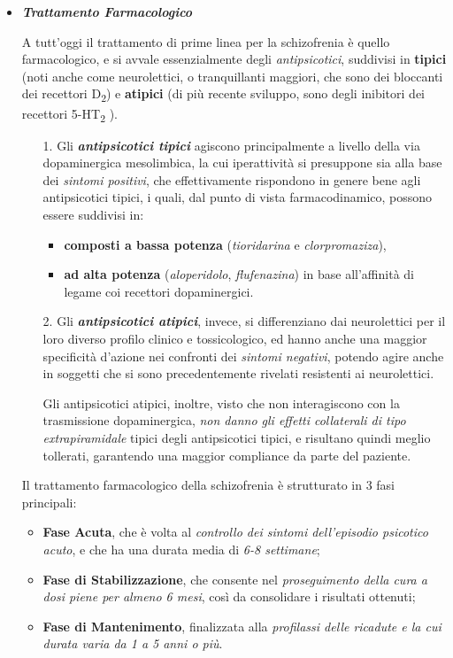 \begin{itemize}
\item
  \textbf{\emph{Trattamento Farmacologico}}

A tutt'oggi il trattamento di prime linea per la schizofrenia è quello
farmacologico, e si avvale essenzialmente degli \emph{antipsicotici},
suddivisi in \textbf{tipici} (noti anche come neurolettici, o
tranquillanti maggiori, che sono dei bloccanti dei recettori
D\textsubscript{2}) e \textbf{atipici} (di più recente sviluppo, sono
degli inibitori dei recettori 5-HT\textsubscript{2} ).

\begin{itemize}
\item[1.]
  Gli \textbf{\emph{antipsicotici tipici}} agiscono principalmente a
  livello della via dopaminergica mesolimbica, la cui iperattività si
  presuppone sia alla base dei \emph{sintomi positivi}, che
  effettivamente rispondono in genere bene agli antipsicotici tipici, i
  quali, dal punto di vista farmacodinamico, possono essere suddivisi
  in:

\begin{itemize}
\item
  \textbf{composti a bassa potenza} (\emph{tioridarina} e
  \emph{clorpromaziza}),
\item
  \textbf{ad alta potenza} (\emph{aloperidolo}, \emph{flufenazina}) in
  base all'affinità di legame coi recettori dopaminergici.
\end{itemize}

\item[2.]
  Gli \textbf{\emph{antipsicotici atipici}}, invece, si differenziano
  dai neurolettici per il loro diverso profilo clinico e tossicologico,
  ed hanno anche una maggior specificità d'azione nei confronti dei
  \emph{sintomi negativi}, potendo agire anche in soggetti che si sono
  precedentemente rivelati resistenti ai neurolettici.

  Gli antipsicotici atipici, inoltre, visto che non interagiscono con la
  trasmissione dopaminergica, \emph{non danno gli effetti collaterali di
  tipo extrapiramidale} tipici degli antipsicotici tipici, e risultano
  quindi meglio tollerati, garantendo una maggior compliance da parte
  del paziente.
\end{itemize}

Il trattamento farmacologico della schizofrenia è strutturato in 3 fasi
principali:

\begin{itemize}
\item
  \textbf{Fase Acuta}, che è volta al \emph{controllo dei sintomi
  dell'episodio psicotico acuto}, e che ha una durata media di \emph{6-8
  settimane};
\item
  \textbf{Fase di Stabilizzazione}, che consente nel \emph{proseguimento
  della cura a dosi piene per almeno 6 mesi}, così da consolidare i
  risultati ottenuti;
\item
  \textbf{Fase di Mantenimento}, finalizzata alla \emph{profilassi delle
  ricadute e la cui durata varia da 1 a 5 anni o più}.
\end{itemize}


\end{itemize}
